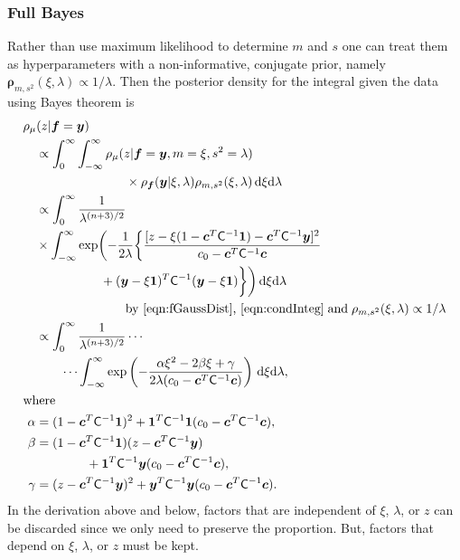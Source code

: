\documentclass[twocolumn]{svjour3}          %
\newcommand{\bm}[1]{\boldsymbol{#1}}
\newcommand{\D}[1]{\text{d}{#1}}
\newcommand{\vc}{\bm{c}}
\newcommand{\vf}{\bm{f}}
\newcommand{\vrho}{\bm{\rho}}
\newcommand{\vy}{\bm{y}}
\newcommand{\vone}{\bm{1}}
\newcommand{\mC}{\mathsf{C}}
\begin{document}
\subsubsection{Full Bayes}

Rather than use maximum likelihood to determine $m$ and $s$ one can treat them as hyperparameters with a non-informative, conjugate prior, namely $\vrho_{m,s^2}(\xi, \lambda) \propto 1/\lambda$. Then the posterior density for the integral given the data using Bayes theorem is
\begin{align*}
\MoveEqLeft[1]{\rho_{\mu}(z | \vf = \vy)} \\
& \propto \int_{0}^\infty \int_{-\infty}^\infty \rho_{\mu}(z | \vf = \vy, m = \xi, s^2 = \lambda) \\
& \hspace{2.5cm} \times  \rho_{\vf}(\vy | \xi, \lambda ) \rho_{m, s^2}(\xi, \lambda) \, \D \xi \D \lambda \\
& \propto \displaystyle \int_{0}^\infty  \frac{1}{\lambda^{(n+3)/2}} \\
& \times \int_{-\infty}^\infty  \exp \biggl( -\frac{1}{2\lambda}\biggl\{
\frac{
[z - \xi (1 - \vc^T \mC^{-1} \vone)  -  \vc^T \mC^{-1} \vy]^2}
{c_0  -\vc ^T \mC^{-1} \vc}  \\
& \hspace{1.8cm} + (\vy - \xi \vone)^T \mC^{-1}(\vy - \xi \vone) \biggr \} \biggr) \, \D \xi \D \lambda \\
& \hspace{2.5cm}
\text{by \eqref{eqn:fGaussDist}, \eqref{eqn:condInteg}} \; \text{and} \; \rho_{m,s^2}(\xi,\lambda) \propto 1/\lambda \\
& \propto \displaystyle \int_{0}^\infty  \frac{1}{\lambda^{(n+3)/2}} \cdots \\ 
& \qquad \cdots \int_{-\infty}^\infty  \exp\left( -\frac{\alpha \xi^2 -2 \beta \xi + \gamma}{2\lambda(c_0  -\vc ^T \mC^{-1} \vc)} \right) \, \D \xi \D \lambda, \\
\intertext{where}
\alpha & = (1 - \vc^T \mC^{-1} \vone)^2 + \vone^T \mC^{-1} \vone (c_0  -\vc ^T \mC^{-1} \vc),\\
\beta & =(1 - \vc^T \mC^{-1} \vone)(z - \vc^T \mC^{-1} \vy ) \\
& \qquad \qquad  + \vone^T \mC^{-1} \vy (c_0  -\vc ^T \mC^{-1} \vc),\\
\gamma &  = (z - \vc^T \mC^{-1} \vy )^2  + \vy^T \mC^{-1} \vy (c_0  -\vc ^T \mC^{-1} \vc).
\end{align*}
In the derivation above and below, factors that are independent of $\xi$, $\lambda$, or $z$ can be discarded since we only need to preserve the proportion.  But, factors that depend on $\xi$, $\lambda$, or $z$ must be kept.  
\end{document}
